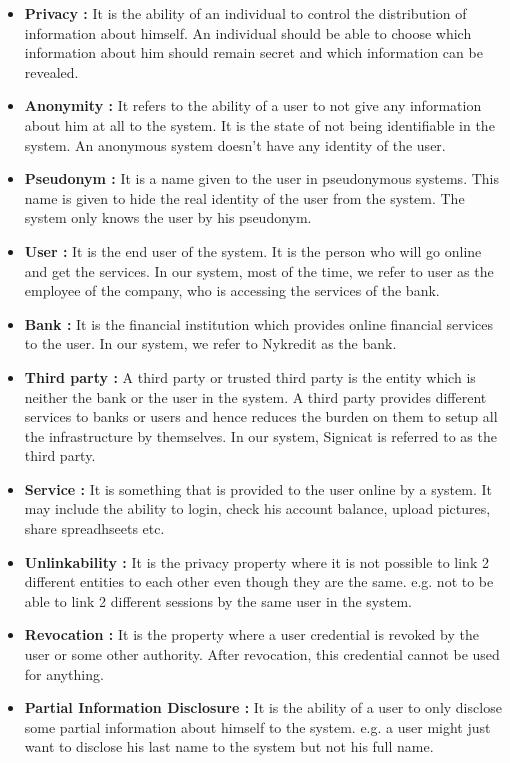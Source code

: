 \begin{itemize}
\item\textbf{Privacy :}
It is the ability of an individual to control the distribution of information about himself. An individual should be able to choose which information about him should remain secret and which information can be revealed.
\item\textbf{Anonymity :}
It refers to the ability of a user to not give any information about him at all to the system. It is the state of not being identifiable in the system. An anonymous system doesn't have any identity of the user.
\item\textbf{Pseudonym :}
It is a name given to the user in pseudonymous systems. This name is given to hide the real identity of the user from the system. The system only knows the user by his pseudonym.
\item\textbf{User :}
It is the end user of the system. It is the person who will go online and get the services. In our system, most of the time, we refer to user as the employee of the company, who is accessing the services of the bank.
\item\textbf{Bank :}
It is the financial institution which provides online financial services to the user. In our system, we refer to Nykredit as the bank.
\item\textbf{Third party :}
A third party or trusted third party is the entity which is neither the bank or the user in the system. A third party provides different services to banks or users and hence reduces the burden on them to setup all the infrastructure by themselves. In our system, Signicat is referred to as the third party.
\item\textbf{Service :}
It is something that is provided to the user online by a system. It may include the ability to login, check his account balance, upload pictures, share spreadhseets etc.
\item\textbf{Unlinkability :}
It is the privacy property where it is not possible to link 2 different entities to each other even though they are the same. 
e.g. not to be able to link 2 different sessions by the same user in the system.
\item\textbf{Revocation :}
It is the property where a user credential is revoked by the user or some other authority. After revocation, this credential cannot be used for anything.
\item\textbf{Partial Information Disclosure :}
It is the ability of a user to only disclose some partial information about himself to the system. e.g. a user might just want to disclose his last name to the system but not his full name.

\end{itemize}
